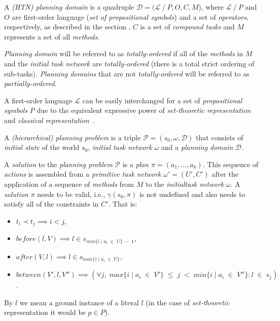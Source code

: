 \begin{defn}\label{def02:11}
    A \emph{(HTN) planning domain} is a quadruple $\mathcal{D} = (\mathcal{L} \ / \ P, O, C, M$), where $\mathcal{L} \ / \ P$ and $O$ are first-order language (\emph{set of propositional symbols}) and a set of \emph{operators}, respectively, as described in the section , $C$ is a set of \emph{compound tasks} and $M$ represents a set of all \emph{methods}.
    
    \emph{Planning domain} will be referred to as \emph{totally-ordered} if all of the \emph{methods} in $M$ and the \emph{initial task network} are \emph{totally-ordered} (there is a total strict ordering of sub-tasks). \emph{Planning domains} that are not \emph{totally-ordered} will be referred to as \emph{partially-ordered}.
\end{defn}

\medskip\noindent
A first-order language $\mathcal{L}$ can be easily interchanged for a set of \emph{propositional symbols} $P$ due to the equivalent expressive power of \emph{set-theoretic representation} and \emph{classical representation}~\cite{nau}.

\begin{defn}\label{def02:12}
    A \emph{(hierarchical) planning problem} is a triple $\mathcal{P} = (s_0,\omega,\mathcal{D})$ that consists of \emph{initial state} of the world $s_0$, \emph{initial task network} $\omega$ and a \emph{planning domain} $\mathcal{D}$.
\end{defn}

\begin{defn}\label{def02:13}%
    A \emph{solution} to the \emph{planning problem} $\mathcal{P}$ is a \emph{plan} $\pi=(a_1,\dots,a_k)$. This sequence of \emph{actions} is assembled from a \emph{primitive task network} $\omega'=(U',C')$ after the application of a sequence of \emph{methods} from $M$ to the \emph{initialtask network} $\omega$. A \emph{solution} $\pi$ needs to be valid, i.e., $\gamma(s_0,\pi)$ is not undefined and also needs to satisfy all of the constraints in $C'$. That is:
    
    \begin{itemize}
        \item $t_i \prec t_j \implies i < j$,
        \item $before(l,V) \implies l \in s_{min\{i \; | \; a_i \; \in \; U\} \; - \; 1}$,
        \item $after(V,l) \implies l \in s_{max\{i \; | \; a_i \; \in \; U\}}$,
        \item $between(V',l,V'') \implies (\forall j, \; max\{i \; | \; a_i \; \in \; V'\} \; \leq \; j \; < \; min\{i \; | \; a_i \; \in \; V''\}: l \; \in \; s_j)$.
    \end{itemize}
    
    By $l$ we mean a ground instance of a literal $l$ (in the case of \emph{set-theoretic} representation it would be $p \in P$).
\end{defn}

